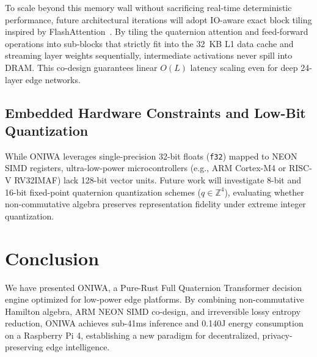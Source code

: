 \documentclass[10pt,twocolumn,letterpaper]{article}
\begin{document}
To scale beyond this memory wall without sacrificing real-time deterministic performance, future architectural iterations will adopt IO-aware exact block tiling inspired by FlashAttention~\cite{dao2022flashattention}. By tiling the quaternion attention and feed-forward operations into sub-blocks that strictly fit into the 32~KB L1 data cache and streaming layer weights sequentially, intermediate activations never spill into DRAM. This co-design guarantees linear $O(L)$ latency scaling even for deep 24-layer edge networks.

\subsection{Embedded Hardware Constraints and Low-Bit Quantization}
While ONIWA leverages single-precision 32-bit floats (\texttt{f32}) mapped to NEON SIMD registers, ultra-low-power microcontrollers (e.g., ARM Cortex-M4 or RISC-V RV32IMAF) lack 128-bit vector units. Future work will investigate 8-bit and 16-bit fixed-point quaternion quantization schemes ($q \in \mathbb{Z}^4$), evaluating whether non-commutative algebra preserves representation fidelity under extreme integer quantization.


\section{Conclusion}
We have presented ONIWA, a Pure-Rust Full Quaternion Transformer decision engine optimized for low-power edge platforms. By combining non-commutative Hamilton algebra, ARM NEON SIMD co-design, and irreversible lossy entropy reduction, ONIWA achieves sub-41ms inference and 0.140J energy consumption on a Raspberry Pi 4, establishing a new paradigm for decentralized, privacy-preserving edge intelligence.
\end{document}
